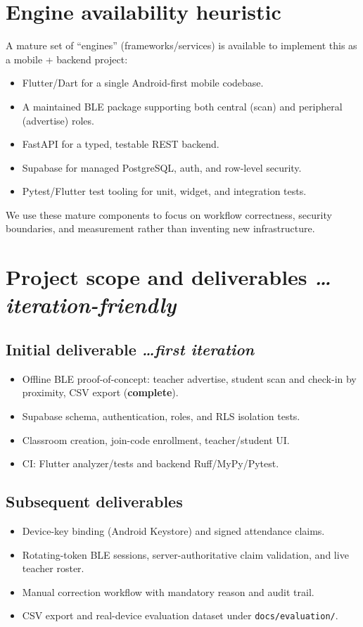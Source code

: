 \documentclass[11pt,a4paper]{article}
\newcommand{\BvrHint}[1]{%
  {\normalfont\normalsize\itshape\hfill #1}}
\begin{document}
\section{Engine availability heuristic}
A mature set of ``engines'' (frameworks/services) is available to
implement this as a mobile + backend project:
\begin{itemize}[leftmargin=0.7cm]
    \item Flutter/Dart for a single Android-first mobile codebase.
    \item A maintained BLE package supporting both central (scan) and
    peripheral (advertise) roles.
    \item FastAPI for a typed, testable REST backend.
    \item Supabase for managed PostgreSQL, auth, and row-level security.
    \item Pytest/Flutter test tooling for unit, widget, and integration
    tests.
\end{itemize}
We use these mature components to focus on workflow correctness, security
boundaries, and measurement rather than inventing new infrastructure.

\section{Project scope and deliverables %
\BvrHint{\ldots iteration-friendly}}
\subsection{Initial deliverable %
\BvrHint{\ldots first iteration}}
\begin{itemize}[leftmargin=0.7cm]
    \item Offline BLE proof-of-concept: teacher advertise, student scan
    and check-in by proximity, CSV export (\textbf{complete}).
    \item Supabase schema, authentication, roles, and RLS isolation tests.
    \item Classroom creation, join-code enrollment, teacher/student UI.
    \item CI: Flutter analyzer/tests and backend Ruff/MyPy/Pytest.
\end{itemize}

\subsection{Subsequent deliverables}
\begin{itemize}[leftmargin=0.7cm]
    \item Device-key binding (Android Keystore) and signed attendance
    claims.
    \item Rotating-token BLE sessions, server-authoritative claim
    validation, and live teacher roster.
    \item Manual correction workflow with mandatory reason and audit
    trail.
    \item CSV export and real-device evaluation dataset under
    \texttt{docs/evaluation/}.
\end{itemize}
\end{document}
